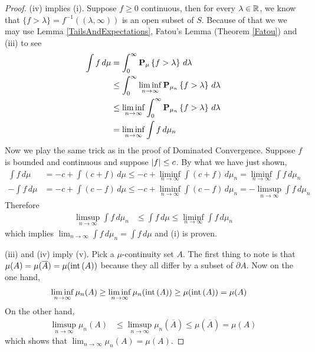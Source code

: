 \begin{proof}
(iv) implies (i).  Suppose $f \geq 0$ continuous, then for every
$\lambda \in \reals$, we know that $\lbrace f > \lambda \rbrace =
f^{-1}((\lambda, \infty))$ is an open subset of $S$.  Because of that
we we may use Lemma
\ref{TailsAndExpectations}, Fatou's Lemma (Theorem \ref{Fatou}) and (iii) to see
\begin{align*}
\int f \, d\mu &= \int_0^\infty \sprobability{f > \lambda}{\mu} \,
d\lambda \\
&\leq \int_0^\infty \liminf_{n \to \infty} \sprobability{f > \lambda}{\mu_n} \, d\lambda \\
&\leq \liminf_{n \to \infty} \int_0^\infty \sprobability{f >
  \lambda}{\mu_n} \, d\lambda \\
&= \liminf_{n \to \infty} \int f \, d\mu_n\\
\end{align*}
Now we play the same trick as in the proof of Dominated Convergence.
Suppose $f$ is bounded and continuous and suppose $\abs{f} \leq c$.
By what we have just shown,
\begin{align*}
\int f \, d\mu &= -c + \int (c+f) \, d\mu \leq -c + \liminf_{n \to
  \infty} \int (c+ f) \, d\mu_n = \liminf_{n \to \infty} \int f \, d\mu_n \\
-\int f\, d\mu &= -c + \int (c-f) \, d\mu \leq -c + \liminf_{n \to
  \infty} \int (c- f) \, d\mu_n =  -\limsup_{n \to \infty} \int f \, d\mu_n
\end{align*}
Therefore 
\begin{align*}
\limsup_{n \to \infty} \int f \, d\mu_n &\leq \int f \, d\mu
\leq \liminf_{n \to \infty} \int f \, d\mu_n
\end{align*} which implies $\lim_{n
  \to \infty} \int f \, d\mu_n = \int f \, d\mu$ and (i) is proven.

 (iii) and (iv) imply (v).  Pick a $\mu$-continuity set $A$.  The first thing to
note is that $\mu(A) = \mu(\overline{A}) = \mu(\interior{A})$ because
they all differ by a subset of $\partial A$.   Now on
the one hand, 
\begin{align*}
\liminf_{n \to \infty} \mu_n(A) &\geq \liminf_{n \to \infty} \mu_n(\interior{A}) \geq \mu(\interior{A}) = \mu(A)
\end{align*}
On the other hand, 
\begin{align*}
\limsup_{n \to \infty} \mu_n(A) &\leq \limsup_{n \to \infty}
\mu_n(\overline{A}) \leq \mu(\overline{A}) = \mu(A)
\end{align*}
which shows that $\lim_{n \to \infty} \mu_n(A) = \mu(A)$.


\end{proof}
